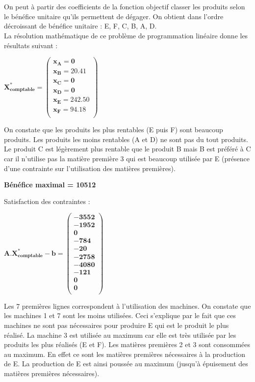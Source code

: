 \documentclass[12pt]{article}
\begin{document}
\\
\\
On peut à partir des coefficients de la fonction objectif classer les produits selon le bénéfice unitaire qu'ils permettent de dégager. On obtient dans l'ordre décroissant de bénéfice unitaire : E, F, C, B, A, D.
\\
La résolution mathématique de ce problème de programmation linéaire donne les résultats suivant :\\
\begin{center}
$\mathbf{X^{*}_{comptable} = 
   \left (
   \begin{array}{c}
      x_{A} = 0 \\
      x_{B} = 20.41 \\
      x_{C} = 0 \\
      x_{D} = 0 \\
      x_{E} = 242.50 \\
      x_{F} = 94.18 \\
   \end{array}
   \right )
 } $ 
\end{center}
On constate que les produits les plus rentables (E puis F) sont beaucoup produits. Les produits
les moins rentables (A et D) ne sont pas du tout produits. Le produit C est légèrement plus rentable que le produit B mais B est préféré à C car il n'utilise pas la matière première 3 qui est beaucoup utilisée par E (présence d'une contrainte sur l'utilisation des matières premières).
\\
\begin{center}
\textbf{Bénéfice maximal = 10512}
\end{center}

Satisfaction des contraintes : 
\begin{center}
$\mathbf{A.X^{*}_{comptable} - b = 
   \left (
   \begin{array}{c}
      -3552 \\
      -1952 \\
      0 \\
      -784 \\
      -20 \\
      -2758 \\
      -4080 \\
      -121 \\
      0 \\
      0\\
   \end{array}
   \right )
 } $ 
\end{center}
Les 7 premières lignes correspondent à l’utilisation des machines. On constate que les
machines 1 et 7 sont les moins utilisées. Ceci s’explique par le fait que ces machines ne sont
pas nécessaires pour produire E qui est le produit le plus réalisé. La machine 3 est utilisée au maximum car elle est très utilisée par les produits les plus réalisés (E et F). Les matières premières 2 et 3 sont consommées au maximum. En effet ce sont les matières premières nécessaires à la production de E. La production de E est ainsi poussée au maximum (jusqu'à épuisement des matières premières nécessaires).
\end{document}
